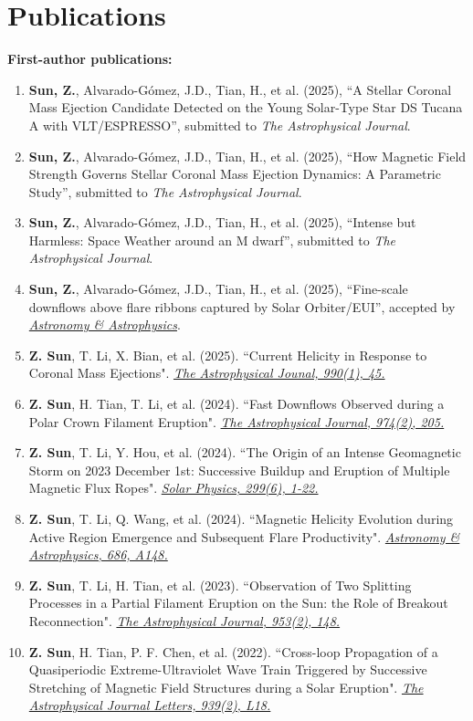 \documentclass{resume}
\begin{document}
\section{Publications}
\textbf{First-author publications:}
\begin{enumerate}
\item \textbf{Sun, Z.}, Alvarado-Gómez, J.D., Tian, H., et al. (2025),
``A Stellar Coronal Mass Ejection Candidate Detected on the Young Solar-Type Star DS Tucana A with VLT/ESPRESSO'',
submitted to \textit{The Astrophysical Journal}.
\item \textbf{Sun, Z.}, Alvarado-Gómez, J.D., Tian, H., et al. (2025),
``How Magnetic Field Strength Governs Stellar Coronal Mass Ejection Dynamics: A Parametric Study'',
submitted to \textit{The Astrophysical Journal}.
\item \textbf{Sun, Z.}, Alvarado-Gómez, J.D., Tian, H., et al. (2025),
``Intense but Harmless: Space Weather around an M dwarf'',
submitted to \textit{The Astrophysical Journal}.
\item \textbf{Sun, Z.}, Alvarado-Gómez, J.D., Tian, H., et al. (2025),
``Fine-scale downflows above flare ribbons captured by Solar Orbiter/EUI'',
accepted by \href{https://arxiv.org/abs/2606.19335}{\textit{Astronomy \& Astrophysics}}.
\item \textbf{Z. Sun}, T. Li, X. Bian, et al. (2025). ``Current Helicity in Response to Coronal Mass Ejections". \href{https://iopscience.iop.org/article/10.3847/1538-4357/adf18b/meta}{\textit{The Astrophysical Jounal, 990(1), 45.}}
\item \textbf{Z. Sun}, H. Tian, T. Li, et al. (2024). ``Fast Downflows Observed during a Polar Crown Filament Eruption". \href{https://iopscience.iop.org/article/10.3847/1538-4357/ad738d}{\textit{The Astrophysical Journal, 974(2), 205.}}
\item \textbf{Z. Sun}, T. Li, Y. Hou, et al. (2024). ``The Origin of an Intense Geomagnetic Storm on 2023 December 1st: Successive Buildup and Eruption of Multiple Magnetic Flux Ropes". \href{https://link.springer.com/article/10.1007/s11207-024-02329-4}{\textit{Solar Physics, 299(6), 1-22.}}
\item \textbf{Z. Sun}, T. Li, Q. Wang, et al. (2024). ``Magnetic Helicity Evolution during Active Region Emergence and Subsequent Flare Productivity". \href{https://www.aanda.org/articles/aa/abs/2024/06/aa48734-23/aa48734-23.html}{\textit{Astronomy \& Astrophysics, 686, A148.}}
\item \textbf{Z. Sun}, T. Li, H. Tian, et al. (2023). ``Observation of Two Splitting Processes in a Partial Filament Eruption on the Sun: the Role of Breakout Reconnection". \href{https://iopscience.iop.org/article/10.3847/1538-4357/ace5b1/meta}{\textit{The Astrophysical Journal, 953(2), 148.}}
\item \textbf{Z. Sun}, H. Tian, P. F. Chen, et al. (2022). ``Cross-loop Propagation of a Quasiperiodic Extreme-Ultraviolet Wave Train Triggered by Successive Stretching of Magnetic Field Structures during a Solar Eruption". \href{https://iopscience.iop.org/article/10.3847/2041-8213/ac9aff/meta}{\textit{The Astrophysical Journal Letters, 939(2), L18.}}




\end{enumerate}
\end{document}
